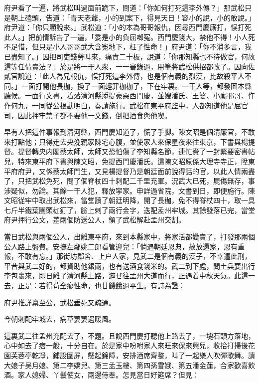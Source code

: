 府尹看了一遍，將武松叫過面前跪下，問道：「你如何打死這李外傳？」那武松只是朝上磕頭，告道：「青天老爺，小的到案下，得見天日！容小的說，小的敢說。」府尹道：「你只顧說來。」武松道：「小的本為哥哥報仇，因尋西門慶廝打，悮打死此人。」把前情訴告了一遍，「委是小的負屈啣寃。西門慶錢大，禁他不得！小人死不足惜，但只是小人哥哥武大含寃地下，枉了性命！」府尹道：「你不消多言，我已盡知了。」因把司吏錢勞叫來，痛責二十板，說道：「你那知縣也不待做官，何故這等任情賣法？」於是將一干人衆，一一審錄過，用筆將武松供招都改了。因向佐貳官說道：「此人為兄報仇，悮打死這李外傳，也是個有義的烈漢，比故殺平人不同。」一面打開他長枷，換了一面輕罪枷枷了，下在牢裏。一干人等，都發囬本縣聽候。一面行文書，着落清河縣添提豪惡西門慶，並嫂潘氏、王婆、小廝鄆哥、仵作何九，一同従公根勘明白，奏請施行。武松在東平府監中，人都知道他是屈官司，因此押牢禁子都不要他一文錢，倒把酒食與他喫。

早有人把這件事報到清河縣，西門慶知道了，慌了手脚。陳文昭是個清廉官，不敢來打點他；只得走去央浼親家陳宅心腹，並使家人來保星夜來往東京，下書與楊提督。提督轉央内閣蔡太師，太師又恐怕傷了李知縣名節，連忙賚了一封緊要密書帖兒，特來東平府下書與陳文昭，免提西門慶潘氏。這陳文昭原係大理寺寺正，陞東平府府尹，又係蔡太師門生，又見楊提督乃是朝廷面前說得話的官，以此人情兩盡了，只把武松免死，問了個脊杖四十刺配二千里充軍。況武大已死，屍傷無存，事涉疑似，勿論。其餘一干人犯，釋放寜家。申詳過省院，文書到日，即便施行。陳文昭従牢中取出武松來，當堂讀了朝廷明降，開了長枷，免不得脊杖四十，取一具七斤半鐵葉團頭枷釘了，臉上刺了兩行金字，迭配孟州牢城。其餘發落已完，當堂府尹押行公文，差兩個防送公人，領了武松解赴孟州交割。

當日武松與兩個公人，出離東平府，來到本縣家中，將家活都變賣了，打發那兩個公人路上盤費。安撫左鄰姚二郎看管迎兒：「倘遇朝廷恩典，赦放還家，恩有重報，不敢有忘。」那街坊鄰舍、上户人家，見武二是個有義的漢子，不幸遭此刑，平昔與武二好的，都資助他銀兩，也有送酒食錢米的。武二到下處，問土兵要出行李包裹來，即日離了清河縣上路，迤ぜ往孟州大道而行，正遇着中秋天氣。此這一去，正是：若得苟全癡性命，也甘饑餓過平生。有詩為證：

府尹推詳禀至公，武松垂死又疏通。

今朝刺配牢城去，病草萋萋遇暖風。

這裏武二往孟州充配去了，不題。且說西門慶打聽他上路去了，一塊石頭方落地，心中如去了痞一般，十分自在。於是家中吩咐家人來旺來保來興兒，收拾打掃後花園芙蓉亭乾凈，鋪設圍屏，懸起錦障，安排酒席齊整，叫了一起樂人吹彈歌舞。請大娘子吴月娘、第二李嬌兒、第三孟玉樓、第四孫雪娥、第五潘金蓮，合家歡喜飲酒。家人媳婦、丫鬟使女，兩邊侍奉。怎見當日好筵席？但見：


